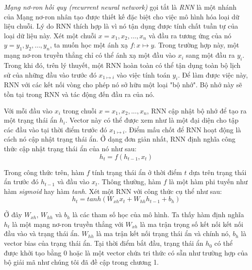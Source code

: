 \textit{Mạng nơ-ron hồi quy (recurrent neural network)} \cite{elman1990} gọi tắt là \textit{RNN} là một nhánh của Mạng nơ-ron nhân tạo được thiết kế đặc biệt cho việc mô hình hóa loại dữ liệu chuỗi. Lý do RNN thích hợp là vì nó tận dụng được tính chất tuần tự của loại dữ liệu này. Xét một chuỗi $x={x_1,x_2,...,x_n}$ và đầu ra tương ứng của nó $y={y_1,y_2,...,y_n}$, ta muốn học một ánh xạ $f: x \mapsto y$. Trong trường hợp này, một mạng nơ-ron truyền thẳng chỉ có thể ánh xạ một đầu vào $x_i$ sang một đầu ra $y_i$. Trong khi đó, trên lý thuyết, một RNN hoàn toàn có thể tận dụng toàn bộ lịch sử của những đầu vào trước đó $x_{1 \mapsto i}$ vào việc tính toán $y_i$. Để làm được việc này, RNN với các kết nối vòng cho phép nó sở hữu một loại "bộ nhớ". Bộ nhớ này sẽ tồn tại trong RNN và tác động đến đầu ra của nó. %


Với mỗi đầu vào $x_i$ trong chuỗi $x={x_1,x_2,...,x_n}$, RNN cập nhật bộ nhớ để tạo ra một trạng thái ẩn $h_i$. Vector này có thể được xem như là một đại diện cho tập các đầu vào tại thời điểm trước đó $x_{1 \mapsto i}$. Điểm mấu chốt để RNN hoạt động là cách nó cập nhật trạng thái ẩn. Ở dạng đơn giản nhất, RNN định nghĩa công thức cập nhật trạng thái ẩn của nó như sau:
\begin{equation} \label{basicRnnEquation}
	h_t = f \left(h_{t-1}, x_t \right)
\end{equation}

Trong công thức trên, hàm $f$ tính trạng thái ẩn ở thời điểm $t$ dựa trên trạng thái ẩn trước đó $h_{t-1}$ và đầu vào $x_t$. Thông thường, hàm $f$ là một hàm phi tuyến như hàm \textit{sigmoid} hay hàm \textit{tanh}. Xét một RNN với công thức cụ thể như sau:  
\begin{equation} \label{rnnWithTanh}
	h_t = tanh \left(W_{xh} x_t + W_{hh}h_{t-1} + b_h \right)
\end{equation}

Ở đây $W_{xh}$, $W_{hh}$ và $b_h$ là các tham số học của mô hình. Ta thấy hàm định nghĩa $h_t$ là một mạng nơ-ron truyền thẳng với $W_{xh}$ là ma trận trọng số kết nối kết nối đầu vào và trạng thái ẩn. $W_{hh}$ là ma trận kết nối trạng thái ẩn và chính nó, $b_h$ là vector bias của trạng thái ẩn. Tại thời điểm bắt đầu, trạng thái ẩn $h_0$ có thể được khởi tạo bằng 0 hoặc là một vector chứa tri thức có sẵn như trường hợp của bộ giải mã như chúng tôi đã đề cập trong chương 1.

